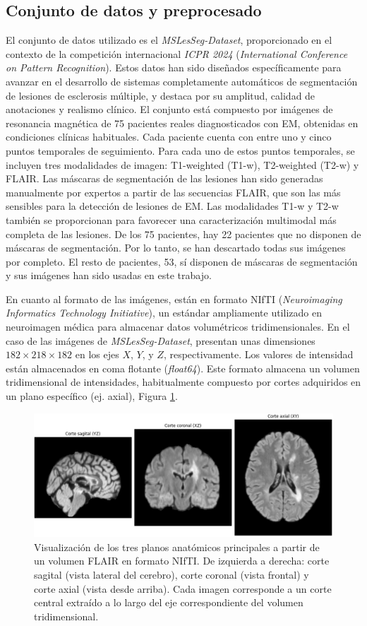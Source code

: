 \documentclass[../main.tex]{subfiles}
\begin{document}
\subsection{Conjunto de datos y preprocesado}
El conjunto de datos utilizado es el \textit{MSLesSeg-Dataset}, proporcionado en el contexto de la competición internacional \textit{ICPR 2024} (\textit{International Conference on Pattern Recognition}). Estos datos han sido diseñados específicamente para avanzar en el desarrollo de sistemas completamente automáticos de segmentación de lesiones de esclerosis múltiple, y destaca por su amplitud, calidad de anotaciones y realismo clínico. El conjunto está compuesto por imágenes de resonancia magnética de 75 pacientes reales diagnosticados con EM, obtenidas en condiciones clínicas habituales. Cada paciente cuenta con entre uno y cinco puntos temporales de seguimiento. Para cada uno de estos puntos temporales, se incluyen tres modalidades de imagen: T1-weighted (T1-w), T2-weighted (T2-w) y FLAIR. Las máscaras de segmentación de las lesiones han sido generadas manualmente por expertos a partir de las secuencias FLAIR, que son las más sensibles para la detección de lesiones de EM. Las modalidades T1-w y T2-w también se proporcionan para favorecer una caracterización multimodal más completa de las lesiones. De los 75 pacientes, hay 22 pacientes que no disponen de máscaras de segmentación. Por lo tanto, se han descartado todas sus imágenes por completo. El resto de pacientes, 53, sí disponen de máscaras de segmentación y sus imágenes han sido usadas en este trabajo.

En cuanto al formato de las imágenes, están en formato NIfTI (\textit{Neuroimaging Informatics Technology Initiative}), un estándar ampliamente utilizado en neuroimagen médica para almacenar datos volumétricos tridimensionales. En el caso de las imágenes de \textit{MSLesSeg-Dataset}, presentan unas dimensiones $182 \times 218 \times 182$ en los ejes $X$, $Y$, y $Z$, respectivamente. Los valores de intensidad están almacenados en coma flotante (\textit{float64}). Este formato almacena un volumen tridimensional de intensidades, habitualmente compuesto por cortes adquiridos en un plano específico (ej. axial), Figura \ref{fig:nifti-ejes}.

\begin{figure}
    \centering
    \includegraphics[width=0.7\linewidth]{imgs/metodologia/nifti1.png}
    \caption{Visualización de los tres planos anatómicos principales a partir de un volumen FLAIR en formato NIfTI. De izquierda a derecha: corte sagital (vista lateral del cerebro), corte coronal (vista frontal) y corte axial (vista desde arriba). Cada imagen corresponde a un corte central extraído a lo largo del eje correspondiente del volumen tridimensional.}
    \label{fig:nifti-ejes}
\end{figure}
\end{document}
